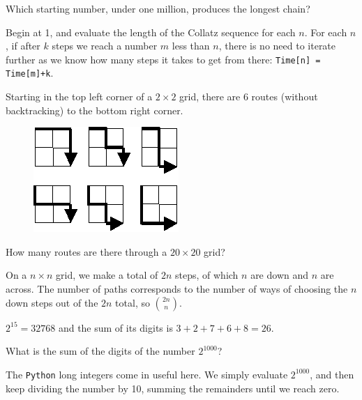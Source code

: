Which starting number, under one million, produces the longest chain?

Begin at 1, and evaluate the length of the Collatz sequence for each $n$.  For each $n$, if after $k$ steps
we reach a number $m$ less than $n$, there is no need to iterate further as we know how many steps it takes to get from
there: \verb"Time[n] = Time[m]+k".




Starting in the top left corner of a $2\times2$ grid, there are 6 routes (without backtracking) to the bottom right corner.
\begin{center}
\begin{figure}[h]
\centering
\includegraphics{./images/p_015.png}
\end{figure}
\end{center}
\vspace{-1cm}
How many routes are there through a $20\times20$ grid?

On a $n\times n$ grid, we make a total of $2n$ steps, of which $n$ are down and $n$ are across.
The number of paths corresponds to the number of ways of choosing the $n$ down steps out of the $2n$ total,
so $\binom{2n}{n}$.



$2^{15} = 32768$ and the sum of its digits is $3 + 2 + 7 + 6 + 8 = 26$.

What is the sum of the digits of the number $2^{1000}$?

The \verb"Python" long integers come in useful here.  We simply evaluate $2^{1000}$,
and then keep dividing the number by 10, summing the remainders until we reach zero.




